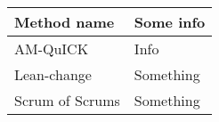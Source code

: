 \centering

 \label{adoptionmethodtable}
\begin{tabular}{l l}
    \bfseries{Method name} & \bfseries{Some info} \\
    \hline
    AM-QuICK & Info \\
    Lean-change & Something  \\
    Scrum of Scrums & Something \\
    \hline
\end{tabular}


\justify
